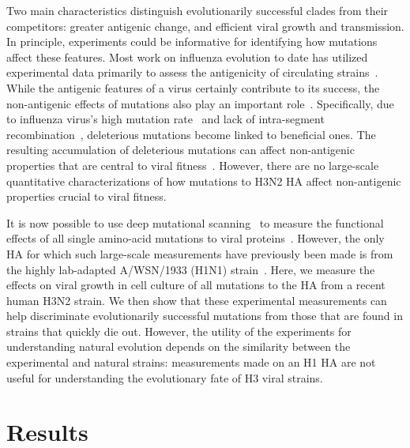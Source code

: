 \documentclass[9pt,twocolumn,twoside]{pnas-new}
\begin{document}
Two main characteristics distinguish evolutionarily successful clades from their competitors: greater antigenic change, and efficient viral growth and transmission.
In principle, experiments could be informative for identifying how mutations affect these features.
Most work on influenza evolution to date has utilized experimental data primarily to assess the antigenicity of circulating strains~\cite{sun2013using,harvey2016identification,neher2016prediction,koel2013substitutions,chambers2015identification,li2016selection}.
While the antigenic features of a virus certainly contribute to its success, the non-antigenic effects of mutations also play an important role~\cite{pybus2007phylogenetic,strelkowa2012clonal,luksza2014predictive,koelle2015effects}.
Specifically, due to influenza virus's high mutation rate~\cite{holland1982rapid,steinhauer1987rapid,lauring2010quasispecies} and lack of intra-segment recombination~\cite{boni2008homologous}, deleterious mutations become linked to beneficial ones.
The resulting accumulation of deleterious mutations can affect non-antigenic properties that are central to viral fitness~\cite{luksza2014predictive}.
However, there are no large-scale quantitative characterizations of how mutations to H3N2 HA affect non-antigenic properties crucial to viral fitness.

It is now possible to use deep mutational scanning~\cite{fowler2014deep} to measure the functional effects of all single amino-acid mutations to viral proteins~\cite{thyagarajan2014inherent,wu2014high,doud2016accurate,haddox2016experimental,qi2015high,haddox2018mapping}.
However, the only HA for which such large-scale measurements have previously been made is from the highly lab-adapted A/WSN/1933 (H1N1) strain~\cite{thyagarajan2014inherent,wu2014high,doud2016accurate}.
Here, we measure the effects on viral growth in cell culture of all mutations to the HA from a recent human H3N2 strain.
We then show that these experimental measurements can help discriminate evolutionarily successful mutations from those that are found in strains that quickly die out.
However, the utility of the experiments for understanding natural evolution depends on the similarity between the experimental and natural strains: measurements made on an H1 HA are not useful for understanding the evolutionary fate of H3 viral strains.

\section*{Results}
\label{sec:results}
\end{document}
